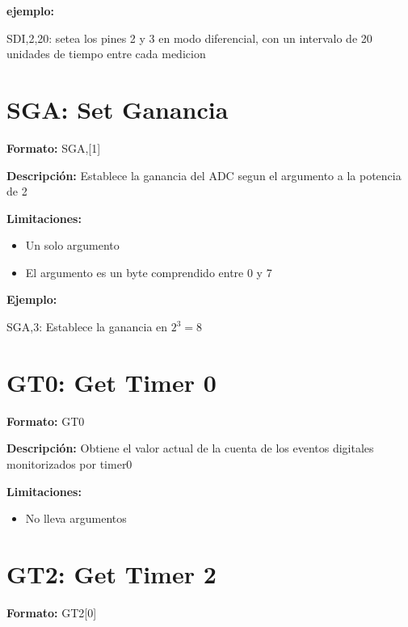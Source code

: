 \textbf{ejemplo:}

SDI,2,20: setea los pines 2 y 3 en modo diferencial, con un intervalo de 20 unidades de tiempo entre cada medicion


\section{SGA: Set Ganancia} %
\label{sub:sga_set_ganancia}


\textbf{Formato:} SGA,[1]

\textbf{Descripción:}
Establece la ganancia del ADC segun el argumento a la potencia de 2

\textbf{Limitaciones:}
\begin{itemize}
  \item Un solo argumento
  \item El argumento es un byte comprendido entre 0 y 7
\end{itemize}

\textbf{Ejemplo:}

SGA,3: Establece la ganancia en $2^{3} = 8$


\section{GT0: Get Timer 0} %
\label{sub:gt0_get_timer_0}


\textbf{Formato:} GT0

\textbf{Descripción:}
Obtiene el valor actual de la cuenta de los eventos digitales monitorizados por timer0

\textbf{Limitaciones:}
\begin{itemize}
  \item No lleva argumentos
\end{itemize}


\section{GT2: Get Timer 2} %
\label{sub:gt2_get_timer_2}

\textbf{Formato:} GT2[0]

